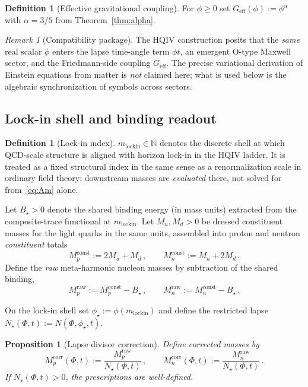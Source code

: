 \documentclass[11pt,a4paper]{article}
\theoremstyle{plain}
\newtheorem{proposition}[theorem]{Proposition}
\theoremstyle{definition}
\newtheorem{definition}[theorem]{Definition}
\theoremstyle{remark}
\newtheorem{remark}[theorem]{Remark}
\theoremstyle{plain}
\theoremstyle{definition}
\begin{document}
\begin{definition}[Effective gravitational coupling]\label{def:Geff}
For $\phi\ge 0$ set $G_{\mathrm{eff}}(\phi):=\phi^{\alpha}$ with $\alpha=3/5$ from Theorem~\ref{thm:alpha}.
\end{definition}

\begin{remark}[Compatibility package]
The HQIV construction posits that the \emph{same} real scalar $\phi$ enters the lapse time-angle term $\phi t$, an emergent O-type Maxwell sector, and the Friedmann-side coupling $G_{\mathrm{eff}}$.
The precise variational derivation of Einstein equations from matter is \emph{not} claimed here; what is used below is the algebraic synchronization of symbols across sectors.
\end{remark}

\subsection{Lock-in shell and binding readout}

\begin{definition}[Lock-in index]
$m_{\mathrm{lockin}}\in\mathbb{N}$ denotes the discrete shell at which QCD-scale structure is aligned with horizon lock-in in the HQIV ladder.
It is treated as a fixed structural index in the same sense as a renormalization scale in ordinary field theory: downstream masses are \emph{evaluated} there, not solved for from~\eqref{eq:Am} alone.
\end{definition}

Let $B_{\star}>0$ denote the shared binding energy (in mass units) extracted from the composite-trace functional at $m_{\mathrm{lockin}}$.
Let $M_u,M_d>0$ be dressed constituent masses for the light quarks in the same units, assembled into proton and neutron \emph{constituent} totals
\[
  M_p^{\mathrm{const}} := 2M_u+M_d\,,\qquad M_n^{\mathrm{const}} := M_u+2M_d\,.
\]
Define the \emph{raw} meta-harmonic nucleon masses by subtraction of the shared binding,
\begin{equation}\label{eq:rawmass}
  M_p^{\mathrm{raw}} := M_p^{\mathrm{const}}-B_{\star}\,,\qquad
  M_n^{\mathrm{raw}} := M_n^{\mathrm{const}}-B_{\star}\,.
\end{equation}

On the lock-in shell set $\phi_{\star}:=\phi(m_{\mathrm{lockin}})$ and define the restricted lapse $N_{\star}(\Phi,t):=N(\Phi,\phi_{\star},t)$.

\begin{proposition}[Lapse divisor correction]\label{prop:divisor}
Define corrected masses by
\[
  M_p^{\mathrm{corr}}(\Phi,t):=\frac{M_p^{\mathrm{raw}}}{N_{\star}(\Phi,t)}\,,\qquad
  M_n^{\mathrm{corr}}(\Phi,t):=\frac{M_n^{\mathrm{raw}}}{N_{\star}(\Phi,t)}\,.
\]
If $N_{\star}(\Phi,t)>0$, the prescriptions are well-defined.
\end{proposition}
\end{document}
